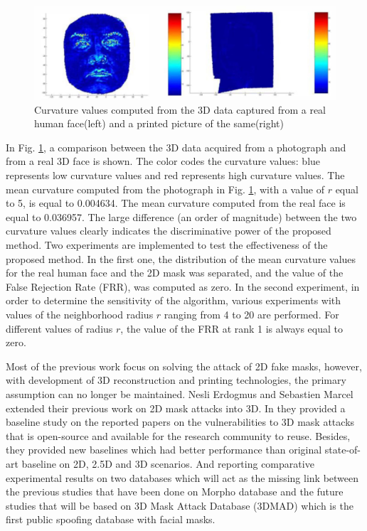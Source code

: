 \documentclass[journal]{IEEEtran}
\begin{document}
\begin{figure}[!b]
\centering
\includegraphics[width=1\linewidth]{img/E_2}
\caption{Curvature values computed from the 3D data captured from a real human face(left) and a printed picture of the same(right)}
\label{fig_E_2}
\end{figure}

In Fig. \ref{fig_E_2}, a comparison between the 3D data acquired from a photograph and from a real 3D face is shown. The color codes the curvature values: blue represents low curvature values and red represents high curvature values. The mean curvature computed from the photograph in Fig. \ref{fig_E_2}, with a value of $r$ equal to 5, is equal to 0.004634. The mean curvature computed from the real face is equal to 0.036957. The large difference (an order of magnitude) between the two curvature values clearly indicates the discriminative power of the proposed method.
Two experiments are implemented to test the effectiveness of the proposed method. In the first one, the distribution of the mean curvature values for the real human face and the 2D mask was separated, and the value of the False Rejection Rate (FRR), was computed as zero. In the second experiment, in order to determine the sensitivity of the algorithm, various experiments with values of the neighborhood radius $r$ ranging from 4 to 20 are performed. For different values of radius $r$, the value of the FRR at rank 1 is always equal to zero.

Most of the previous work focus on solving the attack of 2D fake masks, however, with development of 3D reconstruction and printing technologies, the primary assumption can no longer be maintained. Nesli Erdogmus and Sebastien Marcel extended their previous work \cite{erdogmus2013spoofing} on 2D mask attacks into 3D. In \cite{erdogmus2014spoofing} they provided a baseline study on the reported papers on the vulnerabilities to 3D mask attacks that is open-source and available for the research community to reuse. Besides, they provided new baselines which had better performance than original state-of-art baseline on 2D, 2.5D and 3D scenarios. And reporting comparative experimental results on two databases which will act as the missing link between the previous studies that have been done on Morpho database and the future studies that will be based on 3D Mask Attack Database (3DMAD) which is the first public spoofing database with facial masks.
\end{document}
